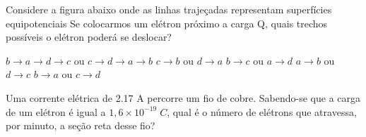 \documentclass[12pt, addpoints]{exam}
\begin{document}
    \begin{questions}
\begin{multicols*}{2}
\question Considere a figura abaixo onde as linhas trajeçadas representam superfícies equipotenciais Se colocarmos um elétron próximo a carga Q, quais trechos possíveis o elétron poderá se deslocar?
        
        \begin{center}
            \begin{minipage}[c]{0.5\linewidth}
            \end{minipage}
        \end{center}
        
        

\begin{choices}
\choice $b\rightarrow a\rightarrow d\rightarrow c$ ou $c\rightarrow d\rightarrow a\rightarrow b$ 
\choice $c\rightarrow b$ ou $d\rightarrow a$ 
\choice $b\rightarrow c$ ou $a\rightarrow d$ 
\choice $a\rightarrow b$ ou $d\rightarrow c$ 
\choice $b\rightarrow a$ ou $c\rightarrow d$ 
\end{choices}
\question Uma corrente elétrica de    2.17 A percorre um ﬁo de cobre. Sabendo-se que a carga de um elétron é igual a $1,6\times 10^{-19}\;C$, qual é o número de elétrons que atravessa, por minuto, a seção reta desse ﬁo?


\end{multicols*}
\end{questions}
\end{document}
